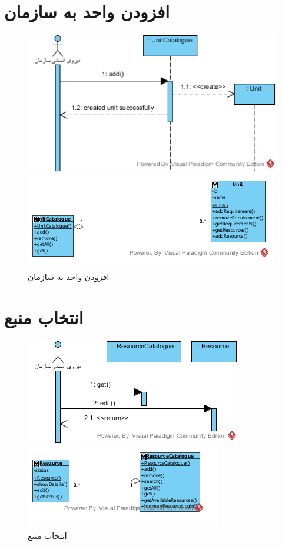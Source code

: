 \section{افزودن واحد به سازمان}
\begin{figure}[H]
	\centering
	\includegraphics[scale=1]{img/sequence-analysis/AddUnitToOrganization}
	
	
	\includegraphics[scale=1]{img/sequence-analysis/AddUnitToOrganizationC}
	\caption{افزودن واحد به سازمان}
\end{figure}


\section{انتخاب منبع}
\begin{figure}[H]
	\centering
	\includegraphics[scale=1]{img/sequence-analysis/ResourceSelection}
	
	
	\includegraphics[scale=1]{img/sequence-analysis/ResourceSelectionC}
	\caption{انتخاب منبع}
\end{figure}


